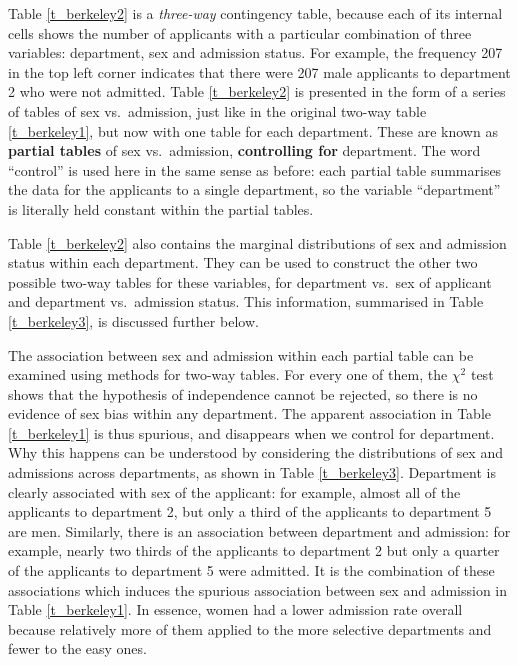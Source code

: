 Table \ref{t_berkeley2} is a \emph{three-way} contingency table, because
each of its internal cells shows the number of applicants with a
particular combination of three variables: department, sex and admission
status. For example, the frequency 207 in the top left corner indicates
that there were 207 male applicants to department 2 who were not
admitted.
Table
\ref{t_berkeley2} is presented in the form of a series of tables of sex
vs.\ admission, just like in the original two-way table
\ref{t_berkeley1}, but now with one table for each department. These are
known as \textbf{partial tables} of sex vs.\ admission,
\textbf{controlling for} department. The word ``control'' is used here
in the same sense as before: each partial table
summarises the data for the applicants to a single department, so the
variable ``department'' is literally held constant within the partial
tables.

Table \ref{t_berkeley2} also contains the marginal distributions of sex and admission status within each
department. They can be used to construct the other two possible two-way
tables for these variables, for department vs.\ sex of applicant and
department vs.\ admission status. This information, summarised in Table
\ref{t_berkeley3}, is discussed further below.

The association between sex and admission within each partial table can
be examined using methods for two-way tables. For every one of
them, the $\chi^{2}$ test shows that the hypothesis of independence
cannot be rejected, so there is no evidence of sex bias within any
department. The apparent association in Table
\ref{t_berkeley1} is thus spurious, and disappears when we control for
department. Why this happens can be understood by considering the
distributions of sex and admissions across departments, as shown in
Table \ref{t_berkeley3}. Department is clearly associated with sex of
the applicant: for example, almost all of the applicants to department
2, but only a third of the applicants to department 5 are men.
Similarly, there is an association between department and admission: for
example, nearly two thirds of the applicants to department 2 but only a
quarter of the applicants to department 5 were admitted. It is the
combination of these associations which induces the spurious association
between sex and admission in Table \ref{t_berkeley1}. In essence, women
had a lower admission rate overall because relatively more of them
applied to the more selective departments and fewer to the
easy ones.

